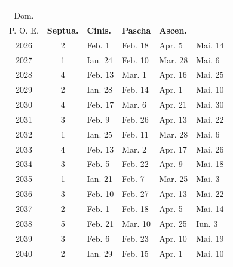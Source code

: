 

\clearpage


\vspace{+.5em}

\begin{center}
\begin{tabular}{|c|c|l|l|l|l|}
\hline
\begin{minipage}[][.33in][]{.35in}\centering\textbf{Anno\\ Dom.}\end{minipage} & 
\begin{minipage}[][.33in][]{.4in}\centering\textbf{Dom.\\ P. O. E.}\end{minipage} & 
\textbf{Septua.} & 
\textbf{Cinis.} & 
\textbf{Pascha} & 
\textbf{Ascen.} \\
\hline
2026 & 2 & Feb. 1 & Feb. 18 & Apr. 5 & Mai. 14 \\
2027 & 1 & Ian. 24 & Feb. 10 & Mar. 28 & Mai. 6 \\
2028 & 4 & Feb. 13 & Mar. 1 & Apr. 16 & Mai. 25 \\
2029 & 2 & Ian. 28 & Feb. 14 & Apr. 1 & Mai. 10 \\
2030 & 4 & Feb. 17 & Mar. 6 & Apr. 21 & Mai. 30 \\
\hline
2031 & 3 & Feb. 9 & Feb. 26 & Apr. 13 & Mai. 22 \\
2032 & 1 & Ian. 25 & Feb. 11 & Mar. 28 & Mai. 6 \\
2033 & 4 & Feb. 13 & Mar. 2 & Apr. 17 & Mai. 26 \\
2034 & 3 & Feb. 5 & Feb. 22 & Apr. 9 & Mai. 18 \\
2035 & 1 & Ian. 21 & Feb. 7 & Mar. 25 & Mai. 3 \\
\hline
2036 & 3 & Feb. 10 & Feb. 27 & Apr. 13 & Mai. 22 \\
2037 & 2 & Feb. 1 & Feb. 18 & Apr. 5 & Mai. 14 \\
2038 & 5 & Feb. 21 & Mar. 10 & Apr. 25 & Iun. 3 \\
2039 & 3 & Feb. 6 & Feb. 23 & Apr. 10 & Mai. 19 \\
2040 & 2 & Ian. 29 & Feb. 15 & Apr. 1 & Mai. 10 \\

\end{tabular}
\end{center}
